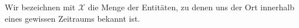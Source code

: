 
Wir bezeichnen mit $\mathcal{X}$ die Menge der Entitäten, zu denen uns der Ort innerhalb eines gewissen Zeitraums bekannt ist.